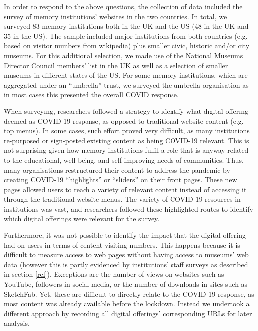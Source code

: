 \documentclass{egpubl}
\begin{document}
In order to respond to the above questions, the collection of data included the survey of memory institutions' websites in the two countries. In total, we surveyed 83 memory institutions both in the UK and the US (48 in the  UK and 35 in the US). The sample included major institutions from both countries (e.g. based on visitor numbers from wikipedia) \cite{Wikipedia,Wikipediaa} plus smaller civic, historic and/or city museums. For this additional selection, we made use of the National Museums Director Council members' list in the UK \cite{nationalmuseums:2020} as well as a selection of smaller museums in different states of the US. For some memory institutions, which are aggregated under an ``umbrella'' trust, we surveyed the umbrella organisation as in most cases this presented the overall COVID response.

When surveying, researchers followed a strategy to identify what digital offering deemed as COVID-19 response, as opposed to traditional website content (e.g. top menus). In some cases, such effort proved very difficult, as many institutions re-purposed or sign-posted existing content as being COVID-19 relevant. This is not surprising given how memory institutions fulfil a role that is anyway related to the educational, well-being, and self-improving needs of communities. Thus, many organisations restructured their content to address the pandemic by creating COVID-19 ``highlights'' or ``sliders'' on their front pages. These new pages allowed users to reach a variety of relevant content instead of accessing it through the traditional website menus. The variety of COVID-19 resources in institutions was vast, and researchers followed these highlighted routes to identify which digital offerings were relevant for the survey. 

Furthermore, it was not possible to identify the impact that the digital offering had on users in terms of content visiting numbers. This happens because it is difficult to measure access to web pages without having access to museums’ web data (however this is partly evidenced by institutions' staff surveys as described in section \ref{rel}). Exceptions are the number of views on websites such as YouTube, followers in social media, or the number of downloads in sites such as SketchFab. Yet, these are difficult to directly relate to the COVID-19 response, as most content was already available before the lockdown. Instead we undertook a different approach by recording all digital offerings' corresponding URLs for later analysis. 
\end{document}
